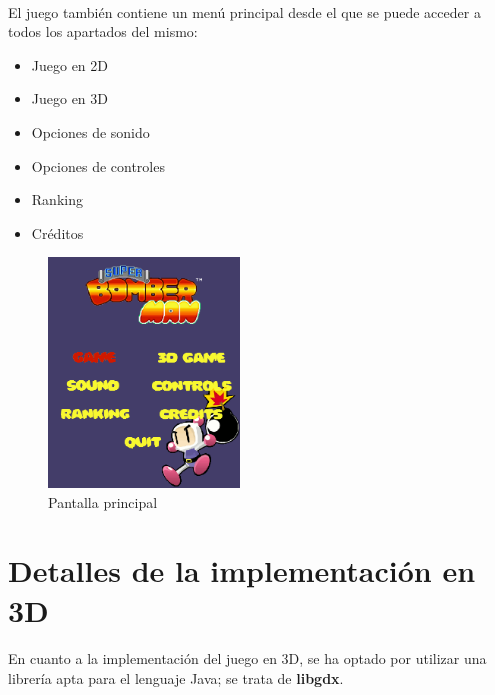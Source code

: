 \documentclass[a4paper]{article}
\begin{document}
\paragraph{}El juego también contiene un menú principal desde el que se puede acceder a todos los apartados del mismo: 
\begin{itemize}
	\item Juego en 2D
	\item Juego en 3D
	\item Opciones de sonido
	\item Opciones de controles
	\item Ranking
	\item Créditos
\end{itemize}
\begin{figure}[H]
	\centering
	\includegraphics[width=2in]{menuses.png}
	\caption{Pantalla principal}
	\label{fig:menuses}
\end{figure}
\newpage

\section{Detalles de la implementación en 3D}
\paragraph{}En cuanto a la implementación del juego en 3D, se ha optado por utilizar una librería apta para el lenguaje Java; se trata de \textbf{libgdx}.
\end{document}
